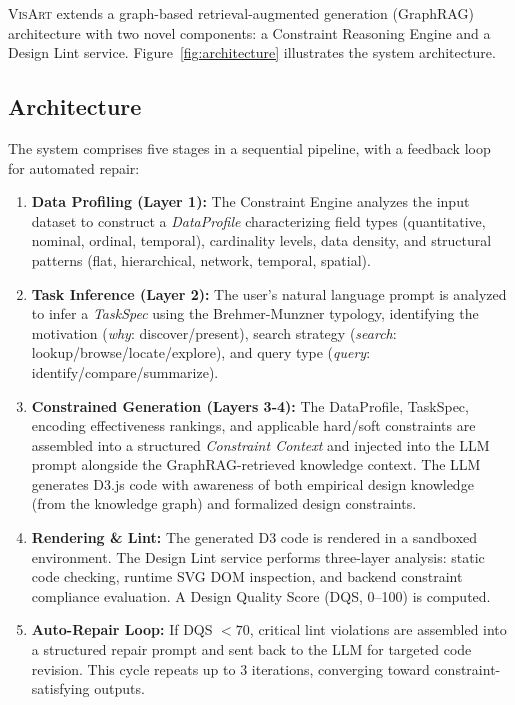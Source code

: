 \documentclass[journal]{vgtc}
\newcommand{\sysname}{\textsc{VisArt}}
\begin{document}
\sysname{} extends a graph-based retrieval-augmented generation (GraphRAG) architecture with two novel components: a Constraint Reasoning Engine and a Design Lint service.
Figure~\ref{fig:architecture} illustrates the system architecture.

\subsection{Architecture}

The system comprises five stages in a sequential pipeline, with a feedback loop for automated repair:

\begin{enumerate}
\item \textbf{Data Profiling (Layer 1):} The Constraint Engine analyzes the input dataset to construct a \textit{DataProfile} characterizing field types (quantitative, nominal, ordinal, temporal), cardinality levels, data density, and structural patterns (flat, hierarchical, network, temporal, spatial).

\item \textbf{Task Inference (Layer 2):} The user's natural language prompt is analyzed to infer a \textit{TaskSpec} using the Brehmer-Munzner typology, identifying the motivation (\textit{why}: discover/present), search strategy (\textit{search}: lookup/browse/locate/explore), and query type (\textit{query}: identify/compare/summarize).

\item \textbf{Constrained Generation (Layers 3-4):} The DataProfile, TaskSpec, encoding effectiveness rankings, and applicable hard/soft constraints are assembled into a structured \textit{Constraint Context} and injected into the LLM prompt alongside the GraphRAG-retrieved knowledge context.
The LLM generates D3.js code with awareness of both empirical design knowledge (from the knowledge graph) and formalized design constraints.

\item \textbf{Rendering \& Lint:} The generated D3 code is rendered in a sandboxed environment.
The Design Lint service performs three-layer analysis: static code checking, runtime SVG DOM inspection, and backend constraint compliance evaluation.
A Design Quality Score (DQS, 0–100) is computed.

\item \textbf{Auto-Repair Loop:} If DQS $< 70$, critical lint violations are assembled into a structured repair prompt and sent back to the LLM for targeted code revision.
This cycle repeats up to 3 iterations, converging toward constraint-satisfying outputs.
\end{enumerate}
\end{document}
